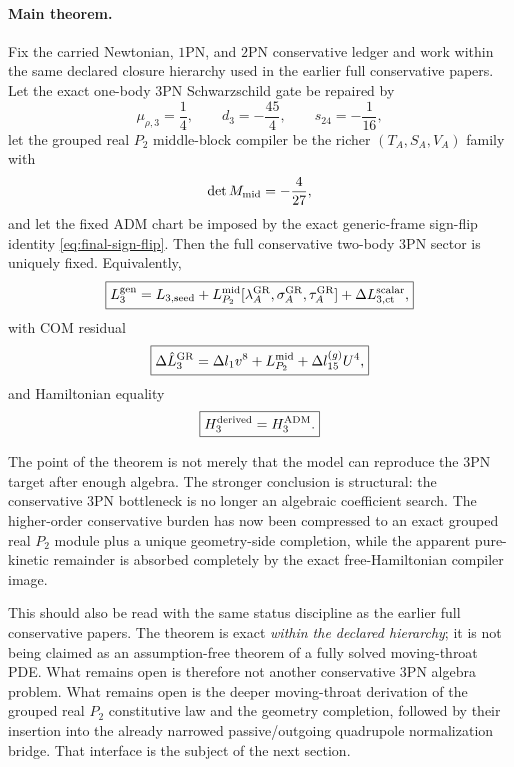 \documentclass[11pt]{article}
\begin{document}
\paragraph{Main theorem.}
Fix the carried Newtonian, $1$PN, and $2$PN conservative ledger and work within
the same declared closure hierarchy used in the earlier full conservative
papers.  Let the exact one-body $3$PN Schwarzschild gate be repaired by
\begin{equation}
\mu_{\rho,3}=\frac14,
\qquad
 d_3=-\frac{45}{4},
\qquad
 s_{24}=-\frac1{16},
\label{eq:final-onebody-ledger}
\end{equation}
let the grouped real $P_2$ middle-block compiler be the richer
\((T_A,S_A,V_A)\) family with
\begin{equation}
\det M_{\rm mid}=-\frac4{27},
\label{eq:final-mid-det}
\end{equation}
and let the fixed ADM chart be imposed by the exact generic-frame sign-flip
identity \eqref{eq:final-sign-flip}.  Then the full conservative two-body $3$PN
sector is uniquely fixed.  Equivalently,
\begin{equation}
\boxed{
L_3^{\rm gen}
=
L_{3,\rm seed}
+
L_{P_2}^{\rm mid}[\lambda_A^{\rm GR},\sigma_A^{\rm GR},\tau_A^{\rm GR}]
+
\Delta L_{3,\rm ct}^{\rm scalar},
}
\label{eq:final-main-theorem-generic}
\end{equation}
with COM residual
\begin{equation}
\boxed{
\Delta \hat L_3^{\rm GR}
=
\Delta l_1v^8
+
L_{P_2}^{\rm mid}
+
\Delta l_{15}^{(g)}U^4,
}
\label{eq:final-main-theorem-com}
\end{equation}
and Hamiltonian equality
\begin{equation}
\boxed{
H_3^{\rm derived}=H_3^{\rm ADM}.
}
\label{eq:final-main-theorem-h}
\end{equation}

The point of the theorem is not merely that the model can reproduce the $3$PN
target after enough algebra.  The stronger conclusion is structural: the
conservative $3$PN bottleneck is no longer an algebraic coefficient search.  The
higher-order conservative burden has now been compressed to an exact grouped real
$P_2$ module plus a unique geometry-side completion, while the apparent
pure-kinetic remainder is absorbed completely by the exact free-Hamiltonian
compiler image.

This should also be read with the same status discipline as the earlier full
conservative papers.  The theorem is exact \emph{within the declared hierarchy};
it is not being claimed as an assumption-free theorem of a fully solved
moving-throat PDE.  What remains open is therefore not another conservative $3$PN
algebra problem.  What remains open is the deeper moving-throat derivation of the
grouped real $P_2$ constitutive law and the geometry completion, followed by
their insertion into the already narrowed passive/outgoing quadrupole
normalization bridge.  That interface is the subject of the next section.
\end{document}
